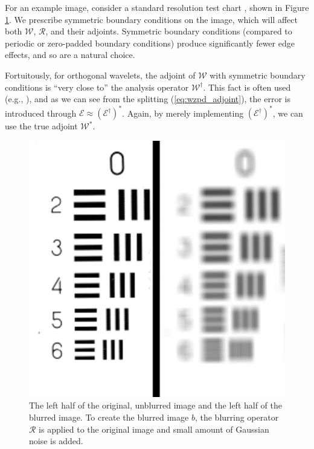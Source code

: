 \documentclass[journal]{IEEEtran}
\begin{document}
For an example image, consider a standard resolution test chart \cite{weber_1993}, shown in Figure \ref{fig:original}.  We prescribe symmetric boundary conditions on the image, which will affect both $\mathcal{W}$, $\mathcal{R}$, and their adjoints.  Symmetric boundary conditions (compared to periodic or zero-padded boundary conditions) produce significantly fewer edge effects, and so are a natural choice.

Fortuitously, for orthogonal wavelets, the adjoint of $\mathcal{W}$ with symmetric boundary conditions is ``very close to'' the analysis operator $\mathcal{W}^\dagger$.  This fact is often used (e.g., \cite{beck_2009}), and as we can see from the splitting (\ref{eq:wzpd_adjoint}), the error is introduced through $\mathcal{E} \approx \left(\mathcal{E}^\dagger\right)^\ast$.  Again, by merely implementing $\left(\mathcal{E}^\dagger\right)^\ast$, we can use the true adjoint $\mathcal{W}^\ast$.

\begin{figure}
   \centering
   \includegraphics[width=0.8\columnwidth]{fig1.pdf}
   \caption{The left half of the original, unblurred image and the left half of the blurred image.  To create the blurred image $b$, the blurring operator $\mathcal{R}$ is applied to the original image and small amount of Gaussian noise is added.}
   \label{fig:original}
\end{figure}
\end{document}

